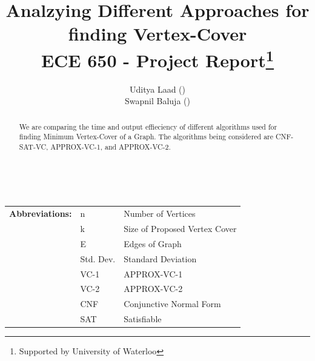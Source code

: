 \documentclass[11pt]{llncs}
\begin{document}
%
\title{Analzying Different Approaches for finding Vertex-Cover\\ ECE 650 - Project Report\thanks{Supported by University of Waterloo}}
%
%
\author{Uditya Laad ()
\\ Swapnil Baluja ()}
%
%

%
\maketitle              %
%

\vspace{-6mm}


\begin{abstract}
	We are comparing the time and output effieciency of different algorithms used for finding Minimum Vertex-Cover of a Graph. The algorithms being considered are CNF-SAT-VC, APPROX-VC-1, and APPROX-VC-2.

\end{abstract}

\vspace{-17mm}
	
$\>$ $\>$ $\>$ 
	\begin{table}[!]	
		\centering
		\setlength{\tabcolsep}{6pt}
		\begin{tabular}{l l l}
			\textbf{Abbreviations:} & n & Number of Vertices\\
			& k & Size of Proposed Vertex Cover\\
			& E & Edges of Graph\\
			& Std. Dev. & Standard Deviation\\
			& VC-1 & APPROX-VC-1\\
			& VC-2 & APPROX-VC-2\\
			& CNF & Conjunctive Normal Form\\
			& SAT & Satisfiable
		\end{tabular}
	\end{table}
\end{document}
